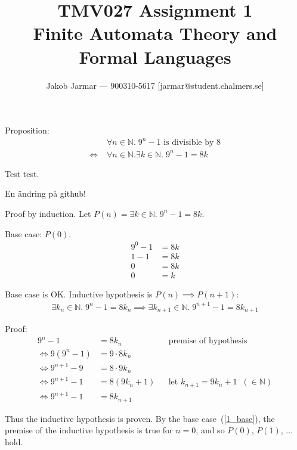 \documentclass{article}
\title{TMV027 Assignment 1 \\ Finite Automata Theory and Formal Languages}
\author{Jakob Jarmar --- 900310-5617 [jarmar@student.chalmers.se]}
\date{}
\begin{document}
\maketitle

\section{}
Proposition:
\begin{equation}
\begin{split}
& \forall n \in \mathbb{N}.\; 9^n - 1 \text{ is divisible by } 8 \\
\iff \; & \forall n \in \mathbb{N} . \exists k \in \mathbb{N}.\; 9^n - 1 = 8k
\end{split}
\end{equation}

Test test.

En ändring på github!

Proof by induction. Let $P(n) = \exists k \in \mathbb{N}.\; 9^n - 1 = 8k$.

Base case: $P(0)$.
\begin{equation} \label{1_base}
\begin{split}
9^0 - 1 & = 8k \\
1 - 1 & = 8k \\
0 & = 8k \\
0 & = k
\end{split}
\end{equation}

Base case is OK. Inductive hypothesis is $P(n) \implies P(n+1)$:
\begin{equation}
\begin{split}
\exists k_n \in \mathbb{N} .\; 9^n - 1 = 8k_n \implies \exists k_{n+1} \in \mathbb{N}.\; 9^{n+1} - 1 = 8k_{n+1}
\end{split}
\end{equation}

Proof:
\begin{align}
9^n - 1 & = 8k_n && \text{premise of hypothesis} \\
\iff 9(9^n - 1) & = 9 \cdot 8k_n \\
\iff 9^{n+1} - 9 & = 8 \cdot 9k_n \\
\iff 9^{n+1} - 1 & = 8(9k_n + 1) && \text{let $k_{n+1} = 9k_n+1 \;\; (\in \mathbb{N})$} \\
\iff 9^{n+1} - 1 & = 8k_{n+1}
\end{align}

Thus the inductive hypothesis is proven. By the base case~(\ref{1_base}), the premise of the inductive hypothesis is true for $n = 0$, and so $P(0)$, $P(1)$, ... hold.
\end{document}
